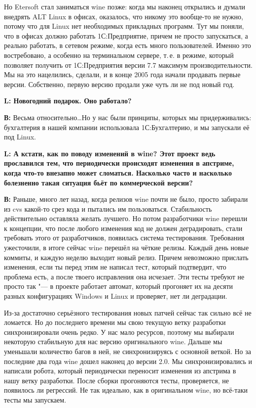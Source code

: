\documentclass[10pt, a5paper]{article}
\begin{document}
Но Etersoft стал заниматься wine позже: когда мы наконец открылись и думали внедрять ALT Linux в офисах, оказалось, что никому это вообще-то не нужно, потому что для Linux нет необходимых прикладных программ. Тут мы поняли, что в офисах должно работать 1С:Предприятие, причем не просто запускаться, а реально работать, в сетевом режиме, когда есть много пользователей. Именно это востребовано, а особенно на терминальном сервере, т.\,е. в режиме, который позволяет получить от 1С:Предприятия версии 7.7 максимум производительности. Мы на это нацелились, сделали, и в конце 2005 года начали продавать первые версии. Собственно, первую версию продали уже чуть ли не под новый год.

{\noindent \bf L: Новогодний подарок. Оно работало?}

{\noindent \bf В:} Весьма относительно\ldots Но у нас были принципы, которых мы придерживались:  бухгалтерия в нашей компании использовала \linebreak 1С:Бухгалтерию, и мы запускали её под Linux.

{\noindent \bf L: А кстати, как по поводу изменений в wine? Этот проект ведь прославился тем, что периодически происходят изменения в апстриме, когда что-то внезапно может сломаться. Насколько часто и насколько болезненно такая ситуация бьёт по коммерческой версии?}

{\noindent \bf В:} Раньше, много лет назад, когда релизов wine почти не было, просто забирали из cvs какой-то срез кода и пытались им пользоваться. Стабильность действительно оставляла желать лучшего. Но потом разработчики wine перешли к концепции, что после любого изменения код не должен деградировать, стали требовать этого от разработчиков, появилась система тестирования. Требования ужесточили, в итоге сейчас wine перешёл на чёткие релизы. Каждый день новые коммиты, и каждую неделю выходит новый релиз. Причем невозможно прислать изменения, если ты перед этим не написал тест, который подтвердит, что  проблема есть, а после твоего исправления она исчезает. Эти тесты требуют не просто так "--- в проекте работает автомат, который прогоняет их на десяти разных конфигурациях Windows и Linux и проверяет, нет ли деградации.

Из-за достаточно серьёзного тестирования новых патчей сейчас так сильно всё не ломается. Но до последнего времени мы свою текущую ветку разработки синхронизировали очень редко. У нас мало ресурсов, поэтому мы выбирали некоторую стабильную для нас версию оригинального wine. Дальше мы уменьшали количество багов в ней, не синхронизируясь с основной веткой. Но за последние два года wine дошел наконец до версии 2.0. Мы синхронизировались и написали робота, который периодически  переносит изменения из апстрима в нашу ветку разработки. После сборки прогоняются тесты, проверяется, не появилось ли регрессий. Не так идеально, как в оригинальном wine, но всё-таки тесты мы запускаем.
\end{document}
